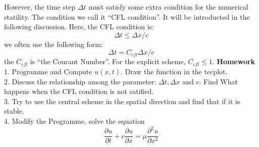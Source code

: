 \documentclass[a4paper]{article}
\begin{document}
However, the time step $\Delta t$ must satisfy some extra condition for the numerical statility. The condition we call it ``CFL condition''. It will be introducted in the following discussion. Here, the CFL condition is:
\begin{equation}
  \Delta t\le \Delta x/c
\end{equation}
we often use the following form:
\begin{equation}
  \Delta t=C_{cfl}\Delta x/c
\end{equation}
the $C_{cfl}$ is ``the Courant Number''. For the explicit scheme, $C_{cfl}\le 1$.
\newline
\textbf{Homework}\\
1. Programme and Compute $u(x,t)$. Draw the function in the tecplot.\\
2. Discuss the relationship among the parameter: $\Delta t, \Delta x$ and $c$. Find What happens when the CFL condition is not satified.\\
3. Try to use the central scheme in the spatial direction and find that if it is stable. \\
4. Modify the Programme, solve the equation \\
\begin{equation}
\frac {\partial u}{\partial t}+c\frac {\partial u}{\partial x}=\mu \frac {\partial^2 u}{\partial x^2}
\end{equation}
\end{document}
